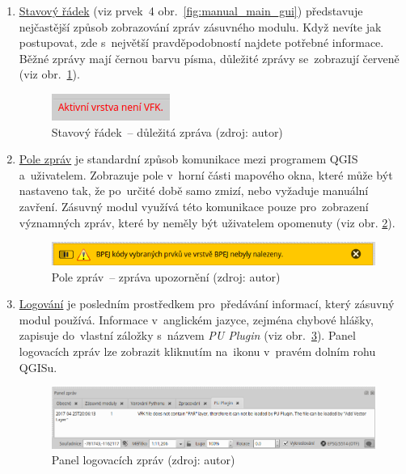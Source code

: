 \begin{enumerate}[leftmargin=1.5cm, noitemsep]
	\item \underline{Stavový řádek} (viz prvek~4
obr.~\ref{fig:manual_main_gui}) představuje nejčastější způsob
zobrazování zpráv zásuvného modulu. Když nevíte jak postupovat, zde
s~největší pravděpodobností najdete potřebné informace. Běžné zprávy
mají černou barvu písma, důležité zprávy se~zobrazují červeně (viz
obr.~\ref{fig:manual_dulezita_zprava}).
	
	\begin{figure}[H] \centering
		\includegraphics[width=.23\textwidth]{./pictures/statusbar-red_message.png}
		\caption[Stavový řádek~– důležitá zpráva]{Stavový
řádek~– důležitá zpráva (zdroj: autor)}
		\label{fig:manual_dulezita_zprava}
 	\end{figure}

	\item \underline{Pole zpráv} je standardní způsob komunikace
mezi programem QGIS a~uživatelem. Zobrazuje pole v~horní části
mapového okna, které může být nastaveno tak, že po~určité době samo
zmizí, nebo vyžaduje manuální zavření. Zásuvný modul využívá této
komunikace pouze pro~zobrazení významných zpráv, které by neměly být
uživatelem opomenuty (viz obr. \ref{fig:manual_zprava_pole_zprav}).

	\begin{figure}[H] \centering
		\includegraphics[width=.7\textwidth]{./pictures/message_bar-message.png}
		\caption[Pole zpráv~– zpráva upozornění]{Pole zpráv~–
zpráva upozornění (zdroj: autor)}
		\label{fig:manual_zprava_pole_zprav}
 	\end{figure}

	\item \underline{Logování} je posledním prostředkem
pro~předávání informací, který zásuvný modul používá. Informace
v~anglickém jazyce, zejména chybové hlášky, zapisuje do~vlastní
záložky s~názvem \textit{PU Plugin} (viz
obr.~\ref{fig:manual_logovaci_panel}). Panel logovacích zpráv lze
zobrazit kliknutím na~ikonu  v~pravém dolním
rohu QGISu.

	\begin{figure}[H] \centering
		\includegraphics[width=1.0\textwidth]{./pictures/log_panel.png}
		\caption[Panel logovacích zpráv]{Panel logovacích
zpráv (zdroj: autor)}
		\label{fig:manual_logovaci_panel}
 	\end{figure}

\end{enumerate}

